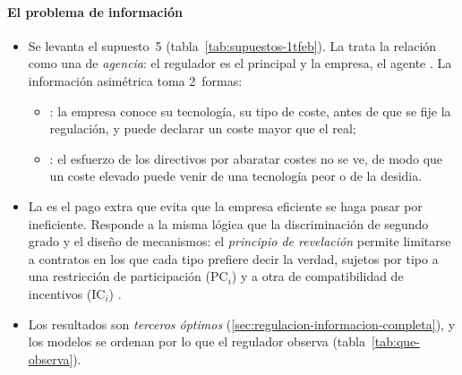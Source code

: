 \documentclass[11pt]{article}
\begin{document}
\paragraph{El problema de información}

\begin{itemize}
\item Se levanta el supuesto~5 (tabla~\ref{tab:supuestos-1tfeb}). La  trata la relación como una de \emph{agencia}: el regulador es el principal y la empresa, el agente . La información asimétrica toma 2~formas:
  \begin{itemize}
  \item {}: la empresa conoce su tecnología, su tipo de coste, antes de que se fije la regulación, y puede declarar un coste mayor que el real;
  \item {}: el esfuerzo de los directivos por abaratar costes no se ve, de modo que un coste elevado puede venir de una tecnología peor o de la desidia.
  \end{itemize}
\item La  es el pago extra que evita que la empresa eficiente se haga pasar por ineficiente. Responde a la misma lógica que la discriminación de segundo grado  y el diseño de mecanismos: el \emph{principio de revelación} permite limitarse a contratos en los que cada tipo prefiere decir la verdad, sujetos por tipo a una restricción de participación ($\mathrm{PC}_i$) y a otra de compatibilidad de incentivos ($\mathrm{IC}_i$) .
\item Los resultados son \emph{terceros óptimos} (\ref{sec:regulacion-informacion-completa}), y los modelos se ordenan por lo que el regulador observa (tabla~\ref{tab:que-observa}).
\end{itemize}
\end{document}
